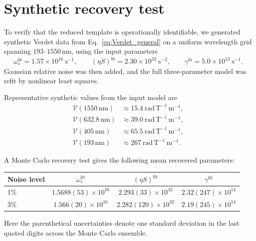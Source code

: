 \documentclass[11pt,a4paper]{article}
\begin{document}
    \section{Synthetic recovery test}
    
    To verify that the reduced template is operationally identifiable, we generated synthetic Verdet data from Eq.~\eqref{eq:Verdet_general} on a uniform wavelength grid spanning \(193\)--\(1550\)\,nm, using the input parameters
    \begin{equation}
        \omega_\ast^{\mathrm{in}} = 1.57\times 10^{16}\ \mathrm{s^{-1}},
        \qquad
        (\eta S)^{\mathrm{in}} = 2.30\times 10^{32}\ \mathrm{s^{-2}},
        \qquad
        \gamma^{\mathrm{in}} = 5.0\times 10^{13}\ \mathrm{s^{-1}}.
    \end{equation}
    Gaussian relative noise was then added, and the full three-parameter model was refit by nonlinear least squares.
    
    Representative synthetic values from the input model are
    \begin{align}
        \mathcal{V}(1550\,\mathrm{nm}) &\approx 15.4\ \mathrm{rad\,T^{-1}\,m^{-1}},\\
        \mathcal{V}(632.8\,\mathrm{nm}) &\approx 39.0\ \mathrm{rad\,T^{-1}\,m^{-1}},\\
        \mathcal{V}(405\,\mathrm{nm}) &\approx 65.5\ \mathrm{rad\,T^{-1}\,m^{-1}},\\
        \mathcal{V}(193\,\mathrm{nm}) &\approx 267\ \mathrm{rad\,T^{-1}\,m^{-1}}.
    \end{align}
    
    A Monte Carlo recovery test gives the following mean recovered parameters:
    \begin{center}
    \begin{tabular}{lccc}
    \hline
    Noise level & $\omega_\ast^{\mathrm{fit}}$ & $(\eta S)^{\mathrm{fit}}$ & $\gamma^{\mathrm{fit}}$ \\
    \hline
    1\% &
    $1.5688(53)\times 10^{16}$ &
    $2.293(33)\times 10^{32}$ &
    $2.32(247)\times 10^{14}$ \\
    3\% &
    $1.566(20)\times 10^{16}$ &
    $2.282(120)\times 10^{32}$ &
    $2.19(245)\times 10^{14}$ \\
    \hline
    \end{tabular}
    \end{center}
    Here the parenthetical uncertainties denote one standard deviation in the last quoted digits across the Monte Carlo ensemble.
    
\end{document}
